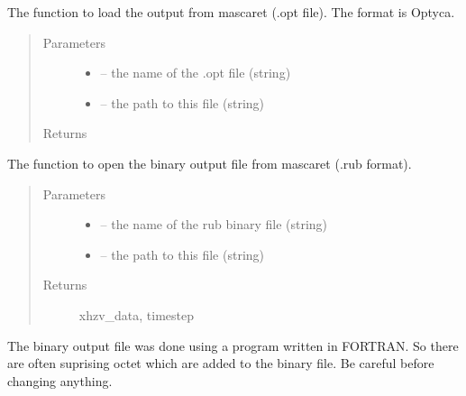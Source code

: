 \documentclass[letterpaper,10pt,english]{sphinxmanual}
\begin{document}
\begin{fulllineitems}
\label{\detokenize{index:src.mascaret.open_res_file}}
The function to load the output from mascaret (.opt file). The format is Optyca.
\begin{quote}\begin{description}
\item[{Parameters}] \leavevmode\begin{itemize}
\item {} 
 -- the name of the .opt file (string)

\item {} 
 -- the path to this file (string)

\end{itemize}

\item[{Returns}] \leavevmode


\end{description}\end{quote}

\end{fulllineitems}


\begin{fulllineitems}
\label{\detokenize{index:src.mascaret.open_rub_file}}
The function to open the binary output file from mascaret (.rub format).
\begin{quote}\begin{description}
\item[{Parameters}] \leavevmode\begin{itemize}
\item {} 
 -- the name of the rub binary file (string)

\item {} 
 -- the path to this file (string)

\end{itemize}

\item[{Returns}] \leavevmode
xhzv\_data, timestep

\end{description}\end{quote}


The binary output file was done using a program written in FORTRAN. So there are often suprising
octet which are added to the binary file. Be careful before changing anything.

\end{fulllineitems}
\end{document}
